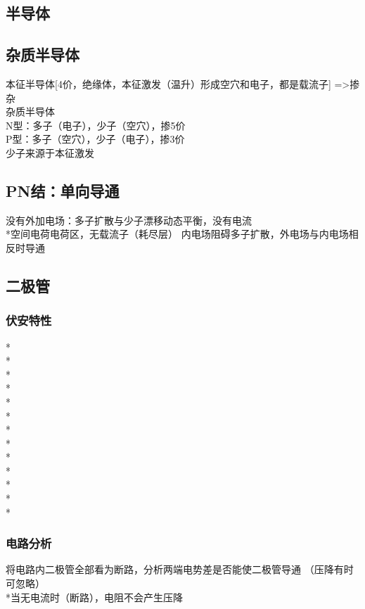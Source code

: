 \documentclass[UTF8, fontset=none]{ctexart}
\begin{document}
\begin{multicols*}{8}
\section{半导体}
\subsection{杂质半导体}
本征半导体[4价，绝缘体，本征激发（温升）形成空穴和电子，都是载流子]   =>掺杂\\
杂质半导体\\
N型：多子（电子），少子（空穴），掺5价\\
P型：多子（空穴），少子（电子），掺3价\\
少子来源于本征激发\\

\subsection{PN结：单向导通}
没有外加电场：多子扩散与少子漂移动态平衡，没有电流\\
*空间电荷电荷区，无载流子（耗尽层）
内电场阻碍多子扩散，外电场与内电场相反时导通

\subsection{二极管}
\subsubsection{伏安特性}%
*\\
*\\
*\\
*\\
*\\
*\\
*\\
*\\
*\\
*\\
*\\
*\\
*
\subsubsection{电路分析}
将电路内二极管全部看为断路，分析两端电势差是否能使二极管导通
（压降有时可忽略）\\
*当无电流时（断路），电阻不会产生压降\\


\end{multicols*}
\end{document}
